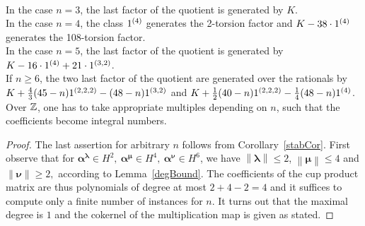 \begin{proposition}
\begin{align*}
\end{align*} 
In the case $n=3$, the last factor of the quotient is generated by $K$. 
\\In the case $n=4$, the class $ 1^{(4)}$ generates the 2-torsion factor and $K-38\cdot1^{(4)}$ generates the 108-torsion factor.
\\In the case $n=5$, the last factor of the quotient is generated by $K - 16\cdot 1^{(4)} + 21\cdot 1^{(3,2)}$.\\
If $n\geq 6$, the two last factor of the quotient are generated over the rationals by $K +\frac{4}{3}(45-n)1^{(2,2,2)} - (48-n)1^{(3,2)}$ and $K+\frac{1}{2}(40-n)1^{(2,2,2)}- \frac{1}{4}(48-n)1^{(4)}$. Over $\mathbb{Z}$, one has to take appropriate multiples depending on $n$, such that the coefficients become integral numbers.
\end{proposition}
\begin{proof} The last assertion for arbitrary $n$ follows from Corollary~\ref{stabCor}. First observe that for $\boldsymbol{\alpha}^{\boldsymbol{\lambda}}\!\in\! H^2,\  \boldsymbol{\alpha}^{\boldsymbol{\mu}}\!\in\! H^4,\  \boldsymbol{\alpha}^{\boldsymbol{\nu}}\!\in\! H^6 $, we have $\left\| \boldsymbol\lambda\right\| \leq 2$, $\left\| \boldsymbol\mu\right\| \leq 4$ and $\left\| \boldsymbol\nu\right\| \geq 2,$ according to Lemma~\ref{degBound}.
The coefficients of the cup product matrix are thus polynomials of degree at most $2+4-2 =4$ and it suffices to compute only a finite number of instances for $n$. It turns out that the maximal degree is $1$ and the cokernel of the multiplication map is given as stated.
\end{proof}


